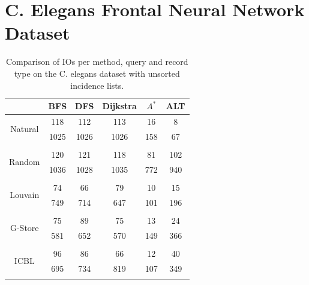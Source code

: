 \section*{C. Elegans Frontal Neural Network Dataset}
\begin{table}[H]
	\begin{center}
		 \begin{tabular}[c]{c c c c c c} \toprule
			  & BFS & DFS & Dijkstra & $A^*$  & ALT \\ \midrule 
 			\multirow{2}{*}{Natural}  & 118 & 112 & 113 & 16 & 8 \\ 
 				 & 1025 & 1026 & 1026 & 158 & 67 \\ 
 				&&&&& \\[-0.5em]
 			\multirow{2}{*}{Random}  & 120 & 121 & 118 & 81 & 102 \\ 
 				 & 1036 & 1028 & 1035 & 772 & 940 \\ 
 				&&&&& \\[-0.5em]
 			\multirow{2}{*}{Louvain}  & 74 & 66 & 79 & 10 & 15 \\ 
 				 & 749 & 714 & 647 & 101 & 196 \\ 
 				&&&&& \\[-0.5em]
 			\multirow{2}{*}{G-Store}  & 75 & 89 & 75 & 13 & 24 \\ 
 				 & 581 & 652 & 570 & 149 & 366 \\ 
 				&&&&& \\[-0.5em]
 			\multirow{2}{*}{ICBL}  & 96 & 86 & 66 & 12 & 40 \\ 
 				 & 695 & 734 & 819 & 107 & 349 \\ 
 				&&&&& \\[-0.5em]
 					\end{tabular}  
  	 \end{center}
	 \caption{Comparison of IOs per method, query and record type on the C. elegans dataset with unsorted incidence lists.}
	 \label{ce-uns}
\end{table}

